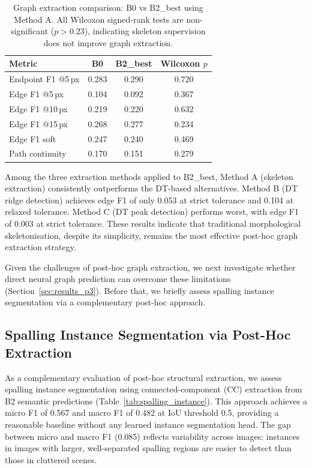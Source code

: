 \documentclass[preprint,12pt]{elsarticle}
\begin{document}
\begin{table}[t]
\centering
\caption{Graph extraction comparison: B0 vs B2\_best using Method A. All Wilcoxon signed-rank tests are non-significant ($p > 0.23$), indicating skeleton supervision does not improve graph extraction.}
\label{tab:b0_vs_b2_graph}
\begin{tabular}{lccc}
\toprule
Metric & B0 & B2\_best & Wilcoxon $p$ \\
\midrule
Endpoint F1 @5\,px & 0.283 & 0.290 & 0.720 \\
Edge F1 @5\,px & 0.104 & 0.092 & 0.367 \\
Edge F1 @10\,px & 0.219 & 0.220 & 0.632 \\
Edge F1 @15\,px & 0.268 & 0.277 & 0.234 \\
Edge F1 soft & 0.247 & 0.240 & 0.469 \\
Path continuity & 0.170 & 0.151 & 0.279 \\
\bottomrule
\end{tabular}
\end{table}

Among the three extraction methods applied to B2\_best, Method A (skeleton extraction) consistently outperforms the DT-based alternatives. Method B (DT ridge detection) achieves edge F1 of only 0.053 at strict tolerance and 0.104 at relaxed tolerance. Method C (DT peak detection) performs worst, with edge F1 of 0.003 at strict tolerance. These results indicate that traditional morphological skeletonisation, despite its simplicity, remains the most effective post-hoc graph extraction strategy.

Given the challenges of post-hoc graph extraction, we next investigate whether direct neural graph prediction can overcome these limitations (Section~\ref{sec:results_p3}). Before that, we briefly assess spalling instance segmentation via a complementary post-hoc approach.


\subsection{Spalling Instance Segmentation via Post-Hoc Extraction}
\label{sec:results_spalling}

As a complementary evaluation of post-hoc structural extraction, we assess spalling instance segmentation using connected-component (CC) extraction from B2 semantic predictions (Table~\ref{tab:spalling_instance}). This approach achieves a micro F1 of 0.567 and macro F1 of 0.482 at IoU threshold 0.5, providing a reasonable baseline without any learned instance segmentation head. The gap between micro and macro F1 (0.085) reflects variability across images: instances in images with larger, well-separated spalling regions are easier to detect than those in cluttered scenes.
\end{document}
